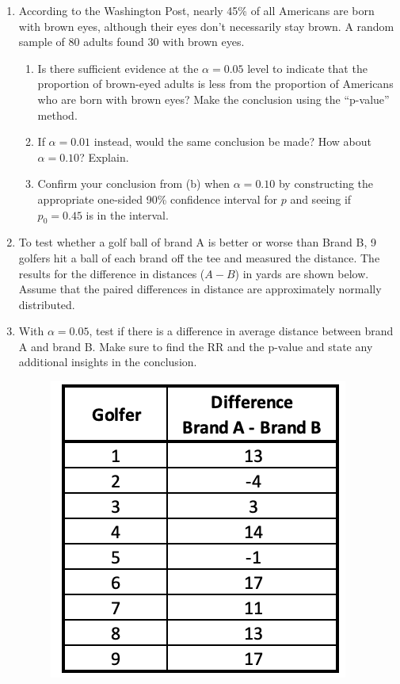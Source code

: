 \documentclass{article}
\begin{document}
\begin{enumerate}
    \item According to the Washington Post, nearly 45\% of all Americans are born with brown eyes, although their eyes don't necessarily stay brown. A random sample of 80 adults found 30 with brown eyes.%
    \begin{enumerate}
        \item Is there sufficient evidence at the $\alpha = 0.05$ level to indicate that the proportion of brown-eyed adults is less from the proportion of Americans who are born with brown eyes? Make the conclusion using the ``p-value'' method.\vspace{130pt}%
        \item If $\alpha = 0.01$ instead, would the same conclusion be made? How about $\alpha = 0.10$? Explain.\vspace{20pt}%
        \item Confirm your conclusion from (b) when $\alpha = 0.10$ by constructing the appropriate one-sided 90\% confidence interval for $p$ and seeing if $p_0 = 0.45$ is in the interval.\vspace{60pt}%
    \end{enumerate}
    
    \item To test whether a golf ball of brand A is better or worse than Brand B, 9 golfers hit a ball of each brand off the tee and measured the distance. The results for the difference in distances ($A - B$) in yards are shown below. Assume that the paired differences in distance are approximately normally distributed.%
    \item[]  With $\alpha = 0.05$, test if there is a difference in average distance between brand A and brand B. Make sure to find the RR and the p-value and state any additional insights in the conclusion.%
    \begin{figure}[H]
        \includegraphics[scale=0.5]{images/data-golf.png}
    \end{figure}\vspace{100pt}
    

\end{enumerate}
\end{document}
